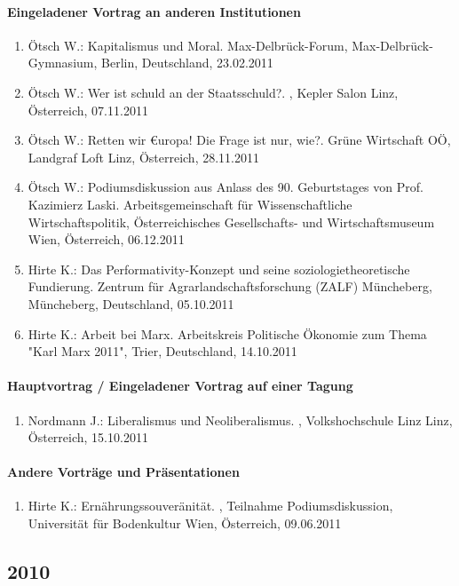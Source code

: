\paragraph{Eingeladener Vortrag an anderen Institutionen}
\begin{enumerate}
	\item Ötsch W.: Kapitalismus und Moral. Max-Delbrück-Forum, Max-Delbrück-Gymnasium, Berlin, Deutschland, 23.02.2011
	\item Ötsch W.: Wer ist schuld an der Staatsschuld?. , Kepler Salon Linz, Österreich, 07.11.2011
	\item Ötsch W.: Retten wir €uropa! Die Frage ist nur, wie?. Grüne Wirtschaft OÖ, Landgraf Loft Linz, Österreich, 28.11.2011
	\item Ötsch W.: Podiumsdiskussion aus Anlass des 90. Geburtstages von Prof. Kazimierz Laski. Arbeitsgemeinschaft für Wissenschaftliche Wirtschaftspolitik, Österreichisches Gesellschafts- und Wirtschaftsmuseum Wien, Österreich, 06.12.2011
	\item Hirte K.: Das Performativity-Konzept und seine soziologietheoretische Fundierung. Zentrum für Agrarlandschaftsforschung (ZALF) Müncheberg, Müncheberg, Deutschland, 05.10.2011
	\item Hirte K.: Arbeit bei Marx. Arbeitskreis Politische Ökonomie zum Thema "Karl Marx 2011", Trier, Deutschland, 14.10.2011
\end{enumerate}
\paragraph{Hauptvortrag / Eingeladener Vortrag auf einer Tagung}
\begin{enumerate}
	\item Nordmann J.: Liberalismus und Neoliberalismus. , Volkshochschule Linz Linz, Österreich, 15.10.2011
\end{enumerate}
\paragraph{Andere Vorträge und Präsentationen}
\begin{enumerate}
	\item Hirte K.: Ernährungssouveränität. , Teilnahme Podiumsdiskussion, Universität für Bodenkultur Wien, Österreich, 09.06.2011
\end{enumerate}
\subsection*{2010}
